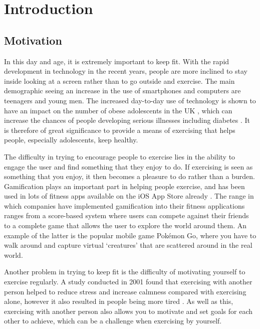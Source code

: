 \chapter{Introduction}

\section{Motivation}


In this day and age, it is extremely important to keep fit. With the rapid development in technology in the recent years, people are more inclined to stay inside looking at a screen rather than to go outside and exercise. The main demographic seeing an increase in the use of smartphones and computers are teenagers and young men. The increased day-to-day use of technology is shown to have an impact on the number of obese adolescents in the UK \cite{Kautiainen2005}, which can increase the chances of people developing serious illnesses including diabetes \cite{Lazar2005}. It is therefore of great significance to provide a means of exercising that helps people, especially adolescents, keep healthy.

The difficulty in trying to encourage people to exercise lies in the ability to engage the user and find something that they enjoy to do. If exercising is seen as something that you enjoy, it then becomes a pleasure to do rather than a burden. Gamification plays an important part in helping people exercise, and has been used in lots of fitness apps available on the iOS App Store already \cite{Lister2014}. The range in which companies have implemented gamification into their fitness applications ranges from a score-based system where users can compete against their friends to a complete game that allows the user to explore the world around them. An example of the latter is the popular mobile game Pok\'{e}mon Go, where you have to walk around and capture virtual `creatures' that are scattered around in the real world.

Another problem in trying to keep fit is the difficulty of motivating yourself to exercise regularly. A study conducted in 2001 found that exercising with another person helped to reduce stress and increase calmness compared with exercising alone, however it also resulted in people being more tired \cite{Plante2001a}. As well as this, exercising with another person also allows you to motivate and set goals for each other to achieve, which can be a challenge when exercising by yourself.


